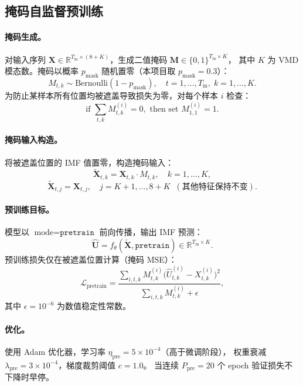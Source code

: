 \documentclass[11pt,a4paper]{article}
\newcommand{\R}{\mathbb{R}}
\newcommand{\mat}[1]{\bm{#1}}
\begin{document}
\subsection{掩码自监督预训练}

\paragraph{掩码生成。}
对输入序列 $\mat{X} \in \R^{T_{\text{in}} \times (8+K)}$，生成二值掩码 $\mat{M} \in \{0, 1\}^{T_{\text{in}} \times K}$，
其中 $K$ 为 VMD 模态数。掩码以概率 $p_{\text{mask}}$ 随机置零（本项目取 $p_{\text{mask}} = 0.3$）：
\begin{equation}\label{eq:mask}
M_{t,k} \sim \text{Bernoulli}(1 - p_{\text{mask}}), \quad t = 1,\dots,T_{\text{in}},\; k = 1,\dots,K.
\end{equation}
为防止某样本所有位置均被遮盖导致损失为零，对每个样本 $i$ 检查：
\[
\text{if } \sum_{t,k} M_{t,k}^{(i)} = 0, \text{ then set } M_{1,1}^{(i)} = 1.
\]

\paragraph{掩码输入构造。}
将被遮盖位置的 IMF 值置零，构造掩码输入：
\begin{equation}
\widetilde{\mat{X}}_{t,k} = \mat{X}_{t,k} \cdot M_{t,k}, \quad k = 1,\dots,K,
\end{equation}
\[
\widetilde{\mat{X}}_{t,j} = \mat{X}_{t,j}, \quad j = K+1,\dots,8+K \;\;(\text{其他特征保持不变}).
\]

\paragraph{预训练目标。}
模型以 $\text{mode} = \texttt{pretrain}$ 前向传播，输出 IMF 预测：
\[
\widehat{\mat{U}} = f_{\theta}(\widetilde{\mat{X}}, \texttt{pretrain}) \in \R^{T_{\text{in}} \times K}.
\]
预训练损失仅在被遮盖位置计算（掩码 MSE）：
\begin{equation}\label{eq:pretrain_loss}
\mathcal{L}_{\text{pretrain}} = \frac{\sum_{i,t,k} M_{t,k}^{(i)} \bigl(\widehat{U}_{t,k}^{(i)} - X_{t,k}^{(i)}\bigr)^2}{\sum_{i,t,k} M_{t,k}^{(i)} + \epsilon},
\end{equation}
其中 $\epsilon = 10^{-6}$ 为数值稳定性常数。

\paragraph{优化。}
使用 Adam 优化器，学习率 $\eta_{\text{pre}} = 5 \times 10^{-4}$（高于微调阶段），
权重衰减 $\lambda_{\text{pre}} = 3 \times 10^{-4}$，梯度裁剪阈值 $c = 1.0$。
当连续 $P_{\text{pre}} = 20$ 个 epoch 验证损失不下降时早停。
\end{document}
